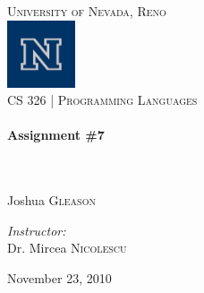 \begin{titlepage}
\begin{center}

\textsc{\LARGE University of Nevada, Reno}\\[.5cm]
\includegraphics[width=0.15\textwidth]{./logo.png}\\[.5cm]

\textsc{\large CS 326 | Programming Languages } \\[.5cm]

\HRule \\[0.4cm]
{ \huge \bfseries Assignment \#7}\\[0.4cm]

\HRule \\[1.5cm]

\begin{minipage}{0.4\textwidth}
  \begin{flushleft} \large
    \emph{}\\
    Joshua \textsc{Gleason}\\
  \end{flushleft}
\end{minipage}
\begin{minipage}{0.4\textwidth}
  \begin{flushright} \large
    \emph{Instructor:} \\
    Dr. Mircea \textsc{Nicolescu}
  \end{flushright}
\end{minipage}

\vspace*{\fill}



\vspace*{\fill}

{\large November 23, 2010}

\end{center}

\end{titlepage}

